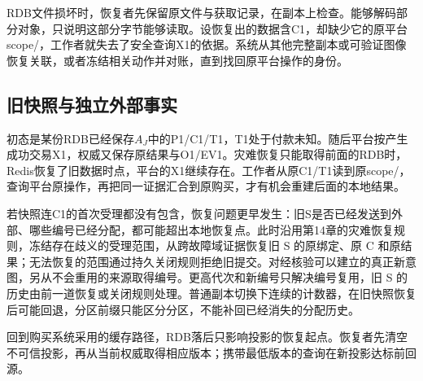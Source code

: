 RDB文件损坏时，恢复者先保留原文件与获取记录，在副本上检查。能够解码部分对象，只说明这部分字节能够读取。设恢复出的数据含C1，却缺少它的原平台scope/，工作者就失去了安全查询X1的依据。系统从其他完整副本或可验证图像恢复关联，或者冻结相关动作并对账，直到找回原平台操作的身份。

\subsection{旧快照与独立外部事实}

初态是某份RDB已经保存$A_J$中的P1/C1/T1，T1处于付款未知。随后平台按产生成功交易X1，权威又保存原结果与O1/EV1。灾难恢复只能取得前面的RDB时，Redis恢复了旧数据时点，平台的X1继续存在。工作者从原C1/T1读到原scope/，查询平台原操作，再把同一证据汇合到原购买，才有机会重建后面的本地结果。


若快照连C1的首次受理都没有包含，恢复问题更早发生：旧S是否已经发送到外部、哪些编号已经分配，都可能超出本地恢复点。此时沿用第14章的灾难恢复规则，冻结存在歧义的受理范围，从跨故障域证据恢复旧 S 的原绑定、原 C 和原结果；无法恢复的范围通过持久关闭规则拒绝旧提交。对经核验可以建立的真正新意图，另从不会重用的来源取得编号。更高代次和新编号只解决编号复用，旧 S 的历史由前一道恢复或关闭规则处理。普通副本切换下连续的计数器，在旧快照恢复后可能回退，分区前缀只能区分分区，不能补回已经消失的分配历史。

回到购买系统采用的缓存路径，RDB落后只影响投影的恢复起点。恢复者先清空不可信投影，再从当前权威取得相应版本；携带最低版本的查询在新投影达标前回源。
\FloatBarrier

